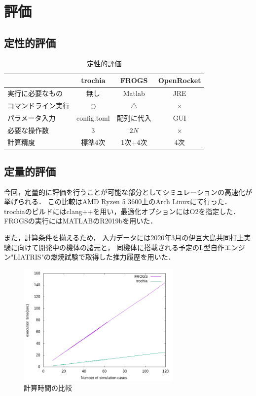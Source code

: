 \documentclass[a4j,10pt]{jsarticle}
\begin{document}
\section{評価}
\subsection{定性的評価}

\begin{table}[htbp]
  \hspace*{-2cm}
  \begin{tabular}{|l|c|c|c|} \hline
         & trochia & FROGS & OpenRocket \\ \hline
	実行に必要なもの & 無し & Matlab & JRE \\
    コマンドライン実行 & $\bigcirc$ & $\bigtriangleup$ & $\times$ \\
    パラメータ入力 & config.toml & 配列に代入 & GUI \\
	必要な操作数 & $3$ & $2N$ & $\times$ \\
	計算精度 & 標準4次 & 1次+4次 & 4次 \\ \hline
  \end{tabular}
  \caption{定性的評価}
\end{table}

\subsection{定量的評価}

今回，定量的に評価を行うことが可能な部分としてシミュレーションの高速化が挙げられる．
この比較はAMD Ryzen 5 3600上のArch Linuxにて行った．
trochiaのビルドにはclang++を用い，最適化オプションにはO2を指定した．
FROGSの実行にはMATLABのR2019bを用いた．

また，計算条件を揃えるため，
入力データには2020年3月の伊豆大島共同打上実験に向けて開発中の機体の諸元と，
同機体に搭載される予定のL型自作エンジン"LIATRIS"の燃焼試験で取得した推力履歴を用いた．

\begin{figure}[htbp]
	\begin{center}
		\includegraphics[width=8cm]{./sim-time.png}
		\caption{計算時間の比較}
		\label{sim-time}
	\end{center}
\end{figure}
\end{document}
